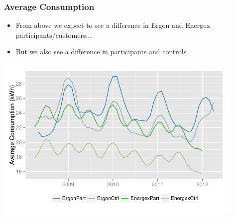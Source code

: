 \documentclass{beamer}
\begin{document}
\begin{frame}
\frametitle{Average Consumption}
\begin{itemize}
\item From above we expect to see a difference in Ergon and Energex
participants/customers$\ldots$
\item But we also see a difference in participants and controls
\end{itemize}
\begin{center}
\includegraphics[width=0.9\textwidth]{figures/MeanConsumption}
\end{center}
\end{frame}
\end{document}

